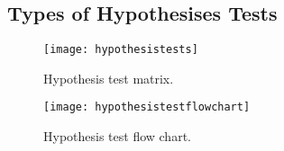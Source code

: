 	\subsection{Types of Hypothesises Tests}
	\begin{figure}[tbp]
		\centering
		\texttt{[image: hypothesistests]}
		\caption[Hypothesis test matrix]{Hypothesis test matrix.}
		\label{fig:hypothesistests}
	\end{figure}

	\begin{figure}[tbp]
		\centering
		\texttt{[image: hypothesistestflowchart]}
		\caption[Hypothesis test flow chart]{Hypothesis test flow chart.}
		\label{fig:hypothesistestflowchart}
	\end{figure}



